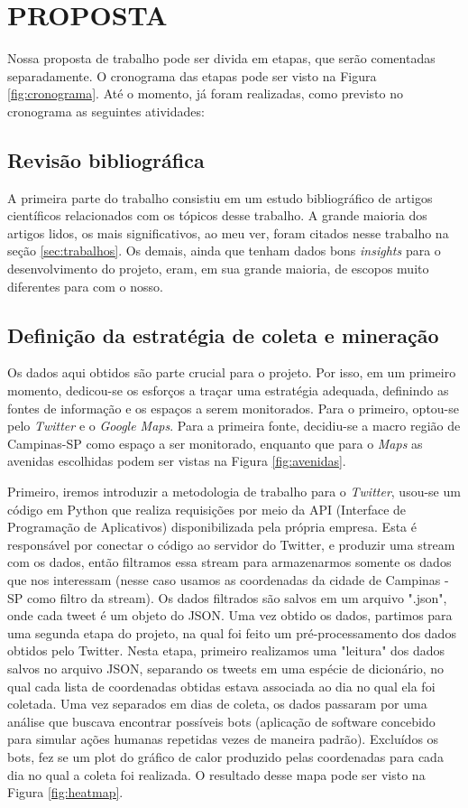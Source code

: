 \section{PROPOSTA} \label{sec:proposta}
Nossa proposta de trabalho pode ser divida em etapas, que serão comentadas separadamente. O cronograma das etapas pode ser visto na Figura \ref{fig:cronograma}. Até o momento, já foram realizadas, como previsto no cronograma as seguintes atividades:

\subsection{Revisão bibliográfica}
A primeira parte do trabalho consistiu em um estudo bibliográfico de artigos científicos relacionados com os tópicos desse trabalho. A grande maioria dos artigos lidos, os mais significativos, ao meu ver, foram citados nesse trabalho na seção \ref{sec:trabalhos}. Os demais, ainda que tenham dados bons \emph{insights} para o desenvolvimento do projeto, eram, em sua grande maioria, de escopos muito diferentes para com o nosso.

\subsection{Definição da estratégia de coleta e mineração}
Os dados aqui obtidos são parte crucial para o projeto. Por isso, em um primeiro momento, dedicou-se os esforços a traçar uma estratégia adequada, definindo as fontes de informação e os espaços a serem monitorados. Para o primeiro, optou-se pelo \emph{Twitter} e o \emph{Google Maps}. Para a primeira fonte, decidiu-se a macro região de Campinas-SP como espaço a ser monitorado, enquanto que para o \emph{Maps} as avenidas escolhidas podem ser vistas na Figura \ref{fig:avenidas}. 

Primeiro, iremos introduzir a metodologia de trabalho para o \emph{Twitter}, usou-se um código em Python que realiza requisições por meio da API (Interface de Programação de Aplicativos) disponibilizada pela própria empresa. Esta é responsável por conectar o código ao servidor do Twitter, e produzir uma stream com os dados, então filtramos essa stream para armazenarmos somente os dados que nos interessam (nesse caso usamos as coordenadas da cidade de Campinas - SP como filtro da stream). Os dados filtrados são salvos em um arquivo ".json", onde cada tweet é um objeto do JSON. Uma vez obtido os dados, partimos para uma segunda etapa do projeto, na qual foi feito um pré-processamento dos dados obtidos pelo Twitter. Nesta etapa, primeiro realizamos uma "leitura" dos dados salvos no arquivo JSON, separando os tweets em uma espécie de dicionário, no qual cada lista de coordenadas obtidas estava associada ao dia no qual ela foi coletada. Uma vez separados em dias de coleta, os dados passaram por uma análise que buscava encontrar possíveis bots (aplicação de software concebido para simular ações humanas repetidas vezes de maneira padrão). Excluídos os bots, fez se um plot do gráfico de calor produzido pelas coordenadas para cada dia no qual a coleta foi realizada. O resultado desse mapa pode ser visto na Figura \ref{fig:heatmap}.

